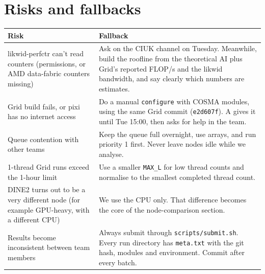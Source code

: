 \documentclass[10pt,a4paper]{article}
\begin{document}
\section{Risks and fallbacks}
\begin{tabularx}{\linewidth}{@{}L L@{}}
\toprule
\textbf{Risk} & \textbf{Fallback}\\
\midrule
likwid-perfctr can't read counters (permissions, or AMD data-fabric counters missing) & Ask on the CIUK channel on Tuesday. Meanwhile, build the roofline from the theoretical AI plus Grid's reported FLOP/s and the likwid bandwidth, and say clearly which numbers are estimates.\\
 Grid build fails, or pixi has no internet access & Do a manual \texttt{configure} with COSMA modules, using the same Grid commit (\texttt{e2d607f}). A gives it until Tue 15:00, then asks for help in the team.\\
Queue contention with other teams & Keep the queue full overnight, use arrays, and run priority 1 first. Never leave nodes idle while we analyse.\\
 1-thread Grid runs exceed the 1-hour limit & Use a smaller \texttt{MAX\_L} for low thread counts and normalise to the smallest completed thread count.\\
DINE2 turns out to be a very different node (for example GPU-heavy, with a different CPU) & We use the CPU only. That difference becomes the core of the node-comparison section.\\
 Results become inconsistent between team members & Always submit through \texttt{scripts/submit.sh}. Every run directory has \texttt{meta.txt} with the git hash, modules and environment. Commit after every batch.\\
\bottomrule
\end{tabularx}
\end{document}
